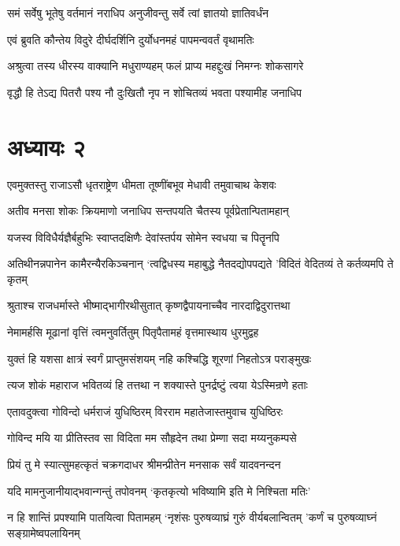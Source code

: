 \twolineshloka
{समं सर्वेषु भूतेषु वर्तमानं नराधिप}
{अनुजीवन्तु सर्वे त्वां ज्ञातयो ज्ञातिवर्धंन}


\twolineshloka
{एवं ब्रुवति कौन्तेय विदुरे दीर्घदर्शिनि}
{दुर्योधनमहं पापमन्ववर्तं वृथामतिः}


\twolineshloka
{अश्रुत्वा तस्य धीरस्य वाक्यानि मधुराण्यहम्}
{फलं प्राप्य महद्दुःखं निमग्नः शोकसागरे}


\twolineshloka
{वृद्धौ हि तेऽद्य पितरौ पश्य नौ दुःखितौ नृप}
{न शोचितव्यं भवता पश्यामीह जनाधिप}


\chapter{अध्यायः २}
\twolineshloka
{एवमुक्तस्तु राजाऽसौ धृतराष्ट्रेण धीमता}
{तूष्णींबभूव मेधावी तमुवाचाथ केशवः}


\twolineshloka
{अतीव मनसा शोकः क्रियमाणो जनाधिप}
{सन्तपयति चैतस्य पूर्वप्रेतान्पितामहान्}


\twolineshloka
{यजस्व विविधैर्यज्ञैर्बहुभिः स्वाप्तदक्षिणैः}
{देवांस्तर्पय सोमेन स्वधया च पितॄनपि}


\threelineshloka
{अतिथीनन्नपानेन कामैरन्यैरकिञ्चनान्}
{`त्वद्विधस्य महाबुद्धे नैतदद्योपपद्यते}
{'विदितं वेदितव्यं ते कर्तव्यमपि ते कृतम्}


\twolineshloka
{श्रुताश्च राजधर्मास्ते भीष्माद्भागीरथीसुतात्}
{कृष्णद्वैपायनाच्चैव नारदाद्विदुरात्तथा}


\twolineshloka
{नेमामर्हसि मूढानां वृत्तिं त्वमनुवर्तितुम्}
{पितृपैतामहं वृत्तमास्थाय धुरमुद्वह}


\twolineshloka
{युक्तं हि यशसा क्षात्रं स्वर्गं प्राप्तुमसंशयम्}
{नहि कश्चिद्धि शूरणां निहतोऽत्र पराङ्मुखः}


\twolineshloka
{त्यज शोकं महाराज भवितव्यं हि तत्तथा}
{न शक्यास्ते पुनर्द्रष्टुं त्वया येऽस्मिन्रणे हताः}


\twolineshloka
{एतावदुक्त्वा गोविन्दो धर्मराजं युधिष्ठिरम्}
{विरराम महातेजास्तमुवाच युधिष्ठिरः}


\twolineshloka
{गोविन्द मयि या प्रीतिस्तव सा विदिता मम}
{सौहृदेन तथा प्रेम्णा सदा मय्यनुकम्पसे}


\twolineshloka
{प्रियं तु मे स्यात्सुमहत्कृतं चक्रगदाधर}
{श्रीमन्प्रीतेन मनसाक सर्वं यादवनन्दन}


\twolineshloka
{यदि मामनुजानीयाद्भवान्गन्तुं तपोवनम्}
{`कृतकृत्यो भविष्यामि इति मे निश्चिता मतिः'}


\threelineshloka
{न हि शान्तिं प्रपश्यामि पातयित्वा पितामहम्}
{`नृशंसः पुरुषव्याघ्रं गुरुं वीर्यबलान्वितम्}
{'कर्णं च पुरुषव्याघ्नं सङ्ग्रामेष्वपलायिनम्}


